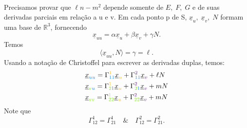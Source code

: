 \documentclass[../differential_geometry.tex]{subfiles}
\begin{document}
\begin{proof*}
	Precisamos provar que \(\ell n - m^{2}\) depende somente de \(E,\; F,\; G\) e de suas derivadas parciais em relação a u e v. Em cada ponto p de S, \(\underline{x}_u,\; \underline{x}_v, \; N\) formam uma base de \(\mathbb{R}^{3}\), fornecendo
	\[
		\underline{x}_{uu} = \alpha \underline{x}_u + \beta \underline{x}_v + \gamma N.
	\]
	Temos
	\[
		\langle \underline{x}_{uu}, N \rangle = \gamma = \ell .
	\]
	Usando a notação de Christoffel para escrever as derivadas duplas, temos:
	\begin{align*}
		 & \underline{x}_{{\color{DodgerBlue2}uu}} = \Gamma_{{\color{DodgerBlue2}11}}^{{\color{DarkGoldenrod1}1}}\underline{x}_{{\color{DarkGoldenrod1}u}} + \Gamma_{{\color{DodgerBlue2}11}}^{{\color{DarkOrchid4}2}}\underline{x}_{{\color{DarkOrchid4}v}} + \ell N                                                          \\
		 & \underline{x}_{{\color{Chartreuse2}v}{\color{DodgerBlue2}u}} = \Gamma_{{\color{Chartreuse2}2}{\color{DodgerBlue2}1}}^{{\color{DarkGoldenrod1}1}}\underline{x}_{{\color{DarkGoldenrod1}u}} + \Gamma_{{\color{Chartreuse2}2}{\color{DodgerBlue2}1}}^{{\color{DarkOrchid4}2}}\underline{x}_{{\color{DarkOrchid4}v}}+mN \\
		 & \underline{x}_{{\color{Chartreuse2}vv}} = \Gamma_{{\color{Chartreuse2} 22}}^{{\color{DarkGoldenrod1}1}}\underline{x}_{{\color{DarkGoldenrod1}u}} + \Gamma_{{\color{Chartreuse2} 22}}^{{\color{DarkOrchid4}2}}\underline{x}_{{\color{DarkOrchid4}v}}+mN                                                              \\
	\end{align*}
	Note que
	\[
		\Gamma_{12}^{1} = \Gamma_{21}^{1} \quad\&\quad \Gamma_{12}^{2}=\Gamma_{21}^{2}.
	\]


\end{proof*}
\end{document}
